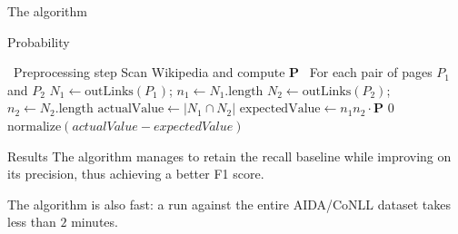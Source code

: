 \documentclass[12pt]{beamer}
\begin{document}
    \begin{frame}{The algorithm}
        \begin{algorithm}[H]
            \caption{Probability}
            \begin{algorithmic}[]
                \STATE \, \COMMENT Preprocessing step
                \STATE Scan Wikipedia and compute \(\mathbf{P}\)
                \STATE \, \COMMENT For each pair of pages \(P_1\) and \(P_2\)
                \STATE \(N_{1} \leftarrow \text{outLinks}(P_1)\); \(n_{1} \leftarrow N_{1}.\text{length}\)
                \STATE \(N_{2} \leftarrow \text{outLinks}(P_2)\); \(n_{2} \leftarrow N_{2}.\text{length}\)
                \STATE \(\text{actualValue} \leftarrow \vert N_{1}\cap N_{2}\vert\)
                \STATE \(\text{expectedValue} \leftarrow n_{1}n_{2}\cdot \mathbf{P}\)
                    \RETURN \(0\)
                \ELSE
                    \RETURN \(\text{normalize}(actualValue - expectedValue)\)
                \ENDIF
            \end{algorithmic}
        \end{algorithm}
    \end{frame}

    \begin{frame}{Results}
        The algorithm manages to retain the recall baseline while improving on its
        precision, thus achieving a better F1 score.
        \begin{figure}
        \end{figure}

        The algorithm is also fast: a run against the entire AIDA/CoNLL dataset
        takes less than \(2\) minutes.
    \end{frame}
\end{document}
